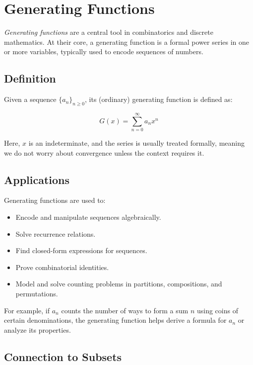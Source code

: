 \newpage
\section{Generating Functions}

\emph{Generating functions} are a central tool in combinatorics and discrete mathematics. At their 
core, a generating function is a formal power series in one or more variables, 
typically used to encode sequences of numbers.

\subsection{Definition}

Given a sequence \( {\{a_n\}}_{n \ge 0} \), its (ordinary) generating function is defined as:

\[
    G(x) = \sum_{n=0}^{\infty} a_n x^n
\]

Here, \(x\) is an indeterminate, and the series is usually treated formally, meaning we do not 
worry about convergence unless the context requires it.

\subsection{Applications}

Generating functions are used to:

\begin{itemize}

    \item Encode and manipulate sequences algebraically.

    \item Solve recurrence relations.

    \item Find closed-form expressions for sequences.

    \item Prove combinatorial identities.

    \item Model and solve counting problems in partitions, compositions, and permutations.

\end{itemize}

For example, if \( a_n \) counts the number of ways to form a sum \(n\) using coins of certain 
denominations, the generating function helps derive a formula for \( a_n \) or analyze its properties.

\subsection{Connection to Subsets}

